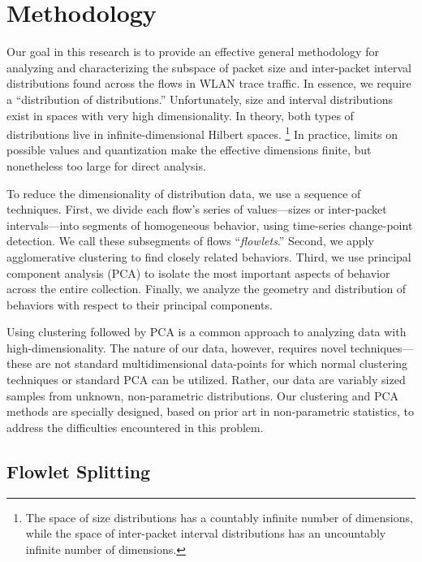\documentclass[conference]{IEEEtran}
\newcommand{\caps}[1]{{\small{#1}}}
\begin{document}
\section{Methodology}\label{sec:methodology}

Our goal in this research is to provide an effective general methodology for analyzing and characterizing the subspace of packet size and inter-packet interval distributions found across the flows in \caps{WLAN} trace traffic. In essence, we require a ``distribution of distributions.'' %
Unfortunately, size and interval distributions exist in spaces with very high dimensionality. In theory, both types of distributions live in infinite-dimensional Hilbert spaces.%
\footnote{The space of size distributions has a countably infinite number of dimensions, while the space of inter-packet interval distributions has an uncountably infinite number of dimensions.}
In practice, limits on possible values and quantization make the effective dimensions finite, but nonetheless too large for direct analysis.%

To reduce the dimensionality of distribution data, we use a sequence of techniques.
First, we divide each flow's series of values---sizes or inter-packet intervals---into segments of homogeneous behavior, using time-series change-point detection. We call these subsegments of flows ``\textit{flowlets}.'' Second, we apply agglomerative clustering to find closely related behaviors. Third, we use principal component analysis (\caps{PCA}) to isolate the most important aspects of behavior across the entire collection. Finally, we analyze the geometry and distribution of behaviors with respect to their principal components.

Using clustering followed by \caps{PCA} is a common approach to analyzing data with high-dimensionality. %
The nature of our data, however, requires novel techniques---these are not standard multidimensional data-points for which normal clustering techniques or standard \caps{PCA} can be utilized. Rather, our data are variably sized samples from unknown, non-parametric distributions. Our clustering and \caps{PCA} methods are specially designed, based on prior art in non-parametric statistics, to address the difficulties encountered in this problem.

\subsection{Flowlet Splitting}
\end{document}
